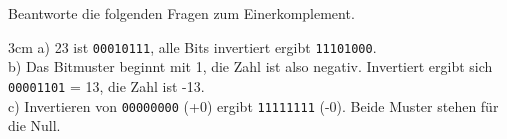 \question[4]
Beantworte die folgenden Fragen zum Einerkomplement.
\begin{solutionbox}{3cm}
a) 23 ist \texttt{00010111}, alle Bits invertiert ergibt \texttt{11101000}. \\
b) Das Bitmuster beginnt mit 1, die Zahl ist also negativ. Invertiert ergibt sich \texttt{00001101} = 13, die Zahl ist -13. \\
c) Invertieren von \texttt{00000000} (+0) ergibt \texttt{11111111} (-0). Beide Muster stehen für die Null.
\end{solutionbox}
